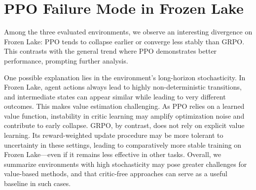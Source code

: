 \section{PPO Failure Mode in Frozen Lake}
\label{app:frozenlake-grpo}
Among the three evaluated environments, we observe an interesting divergence on Frozen Lake: PPO tends to collapse earlier or converge less stably than GRPO. This contrasts with the general trend where PPO demonstrates better performance, prompting further analysis.

One possible explanation lies in the environment’s long-horizon stochasticity. In Frozen Lake, agent actions always lead to highly non-deterministic transitions, and intermediate states can appear similar while leading to very different outcomes. This makes value estimation challenging. As PPO relies on a learned value function, instability in critic learning may amplify optimization noise and contribute to early collapse.
GRPO, by contrast, does not rely on explicit value learning. Its reward-weighted update procedure may be more tolerant to uncertainty in these settings, leading to comparatively more stable training on Frozen Lake—even if it remains less effective in other tasks. Overall, we summarize environments with high stochasticity may pose greater challenges for value-based methods, and that critic-free approaches can serve as a useful baseline in such cases.

